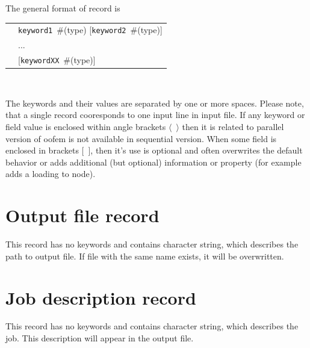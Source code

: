 \documentclass[a4paper]{article}
\makeatletter
\newcommand{\param}[1]{\texttt{#1}} %
\newcommand{\optional}[1]{[#1]} %
\newcommand{\field}[2]{\param{#1}~\#{\tiny(#2)}} %
\newcommand{\optField}[2]{\optional{\field{#1}{#2}}}
\newcommand{\Pmode}[1]{{\sffamily #1}}
\newenvironment{record}[1][]{\begin{tabular}{|ll}}{\end{tabular}\\}
\newcommand{\recentry}[2]{{#1}&{#2}\\}
\newcounter{rcc}
\newenvironment{record}[1][\textwidth]{\setcounter{rcc}{0}\begin{tabular*}{#1}{|ll@{\extracolsep{\fill}}r}}{\end{tabular*}\\}
\newcommand{\recentry}[2]{\ifthenelse{\value{rcc}>0}{&$\backslash$ \\}{\setcounter{rcc}{1}}{#1}&{#2}}
\makeatother
\begin{document}
The general format of record is \\

\noindent
\begin{record}
  \recentry{}{\field{keyword1}{type} \optField{keyword2}{type}}
  \recentry{}{...}
  \recentry{}{\optField{keywordXX}{type}}
\end{record}

The keywords and their values are separated by one or more spaces. Please note, that a single record cooresponds to one input line in input file. \Pmode{If any keyword or field value is enclosed within angle brackets $\langle$~$\rangle$ then it is related to parallel version of oofem is not available in sequential version.
When some field is enclosed in brackets [~], then it's use is optional
and often overwrites the default behavior or adds additional (but
optional) information or property (for example adds a loading to
node). }

\section{Output file record}
\label{_OutputFileRecord}
This record has no keywords and contains character string, which
describes the path to output file. If file with the same name exists,
it will be overwritten.

\section{Job description record}
\label{_JobDescriptionRecord}
This record has no keywords and contains character string, which
describes the job. This description will appear in the output
file.
\end{document}
